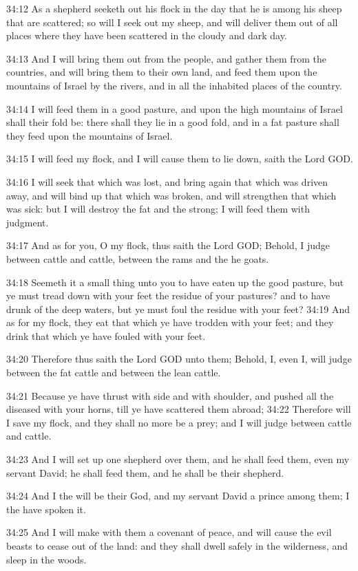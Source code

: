 34:12 As a shepherd seeketh out his flock in the day that he is among
his sheep that are scattered; so will I seek out my sheep, and will
deliver them out of all places where they have been scattered in the
cloudy and dark day.

34:13 And I will bring them out from the people, and gather them from
the countries, and will bring them to their own land, and feed them
upon the mountains of Israel by the rivers, and in all the inhabited
places of the country.

34:14 I will feed them in a good pasture, and upon the high mountains
of Israel shall their fold be: there shall they lie in a good fold,
and in a fat pasture shall they feed upon the mountains of Israel.

34:15 I will feed my flock, and I will cause them to lie down, saith
the Lord GOD.

34:16 I will seek that which was lost, and bring again that which was
driven away, and will bind up that which was broken, and will
strengthen that which was sick: but I will destroy the fat and the
strong; I will feed them with judgment.

34:17 And as for you, O my flock, thus saith the Lord GOD; Behold, I
judge between cattle and cattle, between the rams and the he goats.

34:18 Seemeth it a small thing unto you to have eaten up the good
pasture, but ye must tread down with your feet the residue of your
pastures? and to have drunk of the deep waters, but ye must foul the
residue with your feet?  34:19 And as for my flock, they eat that
which ye have trodden with your feet; and they drink that which ye
have fouled with your feet.

34:20 Therefore thus saith the Lord GOD unto them; Behold, I, even I,
will judge between the fat cattle and between the lean cattle.

34:21 Because ye have thrust with side and with shoulder, and pushed
all the diseased with your horns, till ye have scattered them abroad;
34:22 Therefore will I save my flock, and they shall no more be a
prey; and I will judge between cattle and cattle.

34:23 And I will set up one shepherd over them, and he shall feed
them, even my servant David; he shall feed them, and he shall be their
shepherd.

34:24 And I the \LORD will be their God, and my servant David a prince
among them; I the \LORD have spoken it.

34:25 And I will make with them a covenant of peace, and will cause
the evil beasts to cease out of the land: and they shall dwell safely
in the wilderness, and sleep in the woods.

